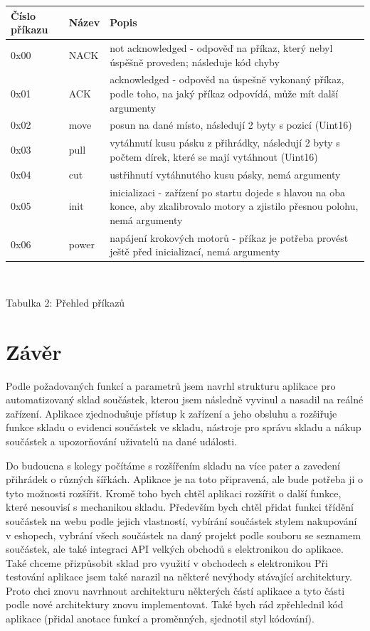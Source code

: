 \documentclass[12pt, a4paper, oneside]{article}
\begin{document}
\begin{center}
\begin{tabular}{| l | l | p{10 cm} |}
\hline
Číslo příkazu & Název & Popis \\ \hline
0x00 & NACK & not acknowledged - odpověď na příkaz, který nebyl úspěšně proveden; následuje kód chyby \\ \hline
0x01 & ACK & acknowledged - odpověd na úspešně vykonaný příkaz, podle toho, na jaký příkaz odpovídá, může mít další argumenty \\ \hline
0x02 & move & posun na dané místo, následují 2 byty s pozicí (Uint16) \\ \hline
0x03 & pull & vytáhnutí kusu pásku z přihrádky, následují 2 byty s počtem dírek, které se mají vytáhnout (Uint16) \\ \hline
0x04 & cut & ustřihnutí vytáhnutého kusu pásky, nemá argumenty \\ \hline
0x05 & init & inicializaci - zařízení po startu dojede s hlavou na oba konce, aby zkalibrovalo motory a zjistilo přesnou polohu, nemá argumenty \\ \hline
0x06 & power & napájení krokových motorů - příkaz je potřeba provést ještě před inicializací, nemá argumenty \\ \hline
\end{tabular}
\\
\vspace{1mm}
\caption{Tabulka 2: Přehled příkazů}
\end{center}
\vspace{6mm}


\newpage

\section*{Závěr} %

Podle požadovaných funkcí a parametrů jsem navrhl strukturu aplikace pro automatizovaný sklad součástek, kterou  jsem následně vyvinul a nasadil na reálné zařízení.
Aplikace zjednodušuje přístup k zařízení a jeho obsluhu a rozšiřuje funkce skladu o evidenci součástek ve skladu, nástroje pro správu skladu a nákup součástek a upozorňování uživatelů na dané události.

Do budoucna s kolegy počítáme s rozšířením skladu na více pater a zavedení přihrádek o různých šířkách. Aplikace je na toto připravená, ale bude potřeba ji o tyto možnosti rozšířit.
Kromě toho bych chtěl aplikaci rozšířit o další funkce, které nesouvisí s mechanikou skladu. Především bych chtěl přidat funkci třídění součástek na webu podle jejich vlastností, vybírání součástek stylem nakupování v eshopech, vybrání všech součástek na daný projekt podle souboru se seznamem součástek, ale také integraci API velkých obchodů s elektronikou do aplikace. Také chceme přizpůsobit sklad pro využití v obchodech s elektronikou
Při testování aplikace jsem také narazil na některé nevýhody stávající architektury. Proto chci znovu navrhnout architekturu některých částí aplikace a tyto části podle nové architektury znovu implementovat. Také bych rád zpřehlednil kód aplikace (přidal anotace funkcí a proměnných, sjednotil styl kódování).
\end{document}
